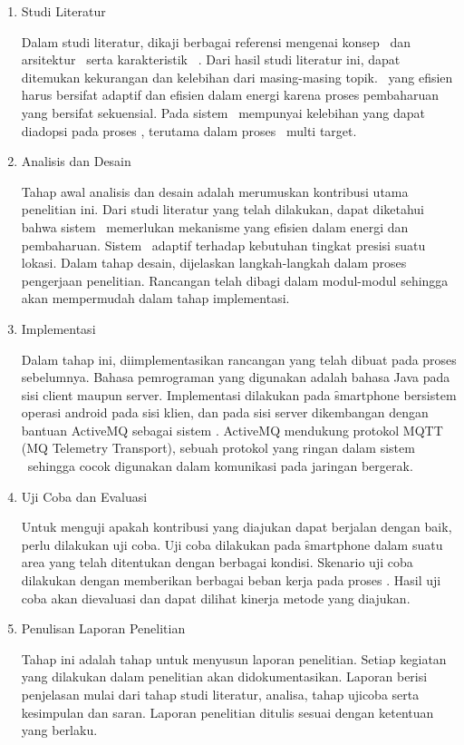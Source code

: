 \begin{enumerate}[noitemsep,nolistsep,leftmargin=0cm,itemindent=.5cm,listparindent=\parindent]
    \item Studi Literatur

Dalam studi literatur, dikaji berbagai referensi mengenai konsep \tracking~dan
arsitektur \pubsub~serta karakteristik \context~\aware. Dari hasil studi
literatur ini, dapat ditemukan kekurangan dan kelebihan dari masing-masing
topik. \Tracking~yang efisien harus bersifat adaptif dan efisien dalam energi
karena proses pembaharuan yang bersifat sekuensial. Pada sistem
\pubsub~mempunyai kelebihan yang dapat diadopsi pada proses \tracking, terutama
dalam proses \tracking~multi target.

    \item Analisis dan Desain

Tahap awal analisis dan desain adalah merumuskan kontribusi utama penelitian
ini.  Dari studi literatur yang telah dilakukan, dapat diketahui bahwa sistem
\tracking~memerlukan mekanisme yang efisien dalam energi dan pembaharuan.
Sistem \tracking~adaptif terhadap kebutuhan tingkat presisi suatu lokasi.
Dalam tahap desain, dijelaskan langkah-langkah dalam proses pengerjaan
penelitian.  Rancangan telah dibagi dalam modul-modul sehingga akan mempermudah
dalam tahap implementasi.

\item Implementasi

Dalam tahap ini, diimplementasikan rancangan yang telah dibuat pada proses
sebelumnya.  Bahasa pemrograman yang digunakan adalah bahasa Java pada sisi
client maupun server.  Implementasi dilakukan pada \f{smartphone} bersistem
operasi android pada sisi klien, dan pada sisi server dikembangan dengan
bantuan ActiveMQ sebagai sistem \pubsub. ActiveMQ mendukung protokol MQTT (MQ
Telemetry Transport), sebuah protokol yang ringan dalam sistem \pubsub~sehingga
cocok digunakan dalam komunikasi pada jaringan bergerak.

\item Uji Coba dan Evaluasi

Untuk menguji apakah kontribusi yang diajukan dapat berjalan dengan baik, perlu
dilakukan uji coba. Uji coba dilakukan pada \f{smartphone} dalam suatu area
yang telah ditentukan dengan berbagai kondisi. Skenario uji coba dilakukan
dengan memberikan berbagai beban kerja pada proses \tracking. Hasil uji coba
akan dievaluasi dan dapat dilihat kinerja metode yang diajukan.

\item Penulisan Laporan Penelitian

Tahap ini adalah tahap untuk menyusun laporan penelitian. Setiap kegiatan yang
dilakukan dalam penelitian akan didokumentasikan. Laporan berisi penjelasan
mulai dari tahap studi literatur, analisa, tahap ujicoba serta kesimpulan dan
saran.  Laporan penelitian ditulis sesuai dengan ketentuan yang berlaku.

\end{enumerate}
